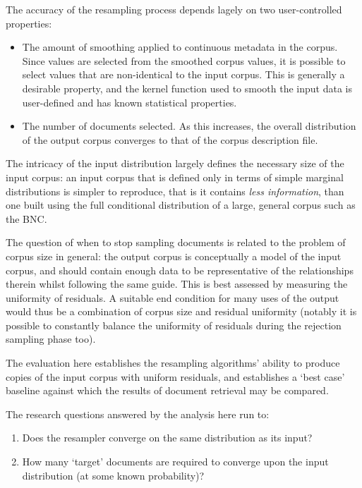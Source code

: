 
The accuracy of the resampling process depends lagely on two user-controlled properties:

\begin{itemize}
    \item The amount of smoothing applied to continuous metadata in the corpus.  Since values are selected from the smoothed corpus values, it is possible to select values that are non-identical to the input corpus.  This is generally a desirable property, and the kernel function used to smooth the input data is user-defined and has known statistical properties.
    \item The number of documents selected.  As this increases, the overall distribution of the output corpus converges to that of the corpus description file.
\end{itemize}


The intricacy of the input distribution largely defines the necessary size of the input corpus: an input corpus that is defined only in terms of simple marginal distributions is simpler to reproduce, that is it contains \textit{less information}, than one built using the full conditional distribution of a large, general corpus such as the BNC.

The question of when to stop sampling documents is related to the problem of corpus size in general: the output corpus is conceptually a model of the input corpus, and should contain enough data to be representative of the relationships therein whilst following the same guide.  This is best assessed by measuring the uniformity of residuals.  A suitable end condition for many uses of the output would thus be a combination of corpus size and residual uniformity (notably it is possible to constantly balance the uniformity of residuals during the rejection sampling phase too).

The evaluation here establishes the resampling algorithms' ability to produce copies of the input corpus with uniform residuals, and establishes a `best case' baseline against which the results of document retrieval may be compared.

The research questions answered by the analysis here run to:

\begin{enumerate}
    \item Does the resampler converge on the same distribution as its input?
    \item How many `target' documents are required to converge upon the input distribution (at some known probability)?
\end{enumerate}


